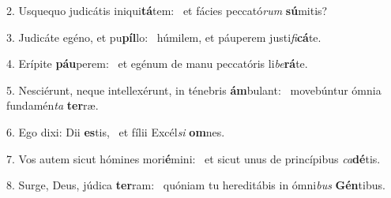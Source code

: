 2. Usquequo judicátis iniqui\textbf{tá}tem: \ast\  et fácies peccató\textit{rum} \textbf{sú}mitis?\

3. Judicáte egéno, et pu\textbf{píl}lo: \ast\  húmilem, et páuperem justi\textit{fi}\textbf{cá}te.\

4. Erípite \textbf{páu}perem: \ast\  et egénum de manu peccatóris li\textit{be}\textbf{rá}te.\

5. Nesciérunt, neque intellexérunt, in ténebris \textbf{ám}bulant: \ast\  movebúntur ómnia fundamén\textit{ta} \textbf{ter}ræ.\

6. Ego dixi: Dii \textbf{es}tis, \ast\  et fílii Excél\textit{si} \textbf{om}nes.\

7. Vos autem sicut hómines mori\textbf{é}mini: \ast\  et sicut unus de princípibus \textit{ca}\textbf{dé}tis.\

8. Surge, Deus, júdica \textbf{ter}ram: \ast\  quóniam tu hereditábis in ómni\textit{bus} \textbf{Gén}tibus.\

